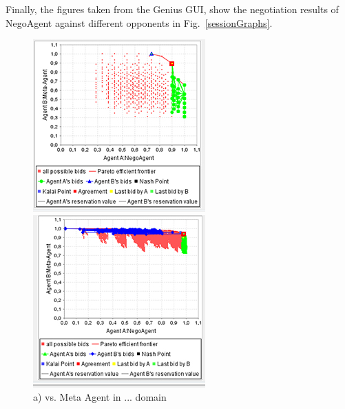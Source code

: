 \documentclass[html]{report}    %
\begin{document}
Finally, the figures taken from the Genius GUI, show the negotiation results of NegoAgent against different opponents in Fig.~\ref{sessionGraphs}.
\begin{figure}
\centering
\begin{minipage}{.3\textwidth}
  \centering
  \includegraphics[width=.9\linewidth]{1}
  \caption*{a) vs. Meta Agent in ... domain}
\end{minipage}%
\begin{minipage}{.3\textwidth}
  \centering
  \includegraphics[width=.9\linewidth]{2}

\end{minipage}
\end{figure}
\end{document}
